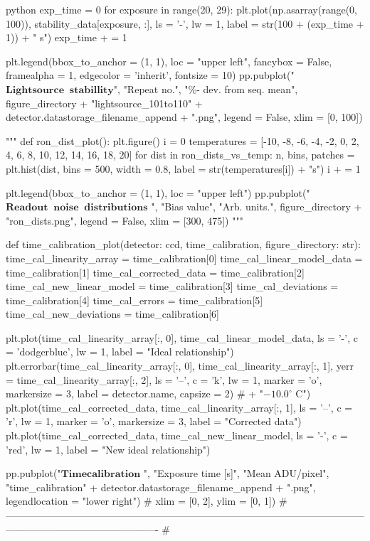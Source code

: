 \documentclass[../main.tex]{subfiles}
\begin{document}
\begin{mintedbox}{python}
exp_time  =  0
for exposure in range(20, 29):
plt.plot(np.asarray(range(0, 100)), stability_data[exposure, :], ls  =  '-', lw  =  1,
label  =  str(100 + (exp_time + 1)) + " s")
exp_time + =  1

plt.legend(bbox_to_anchor  =  (1, 1), loc  =  "upper left", fancybox  =  False, framealpha  =  1, edgecolor  =  'inherit',
fontsize  =  10)
pp.pubplot("$\mathbf{Lightsource\;\;stabillity}$", "Repeat no.", "\%- dev. from seq. mean",
figure_directory + "lightsource_101to110" + detector.datastorage_filename_append + ".png",
legend  =  False, xlim  =  [0, 100])


"""
def ron_dist_plot():
plt.figure()
i  =  0
temperatures  =  [-10, -8, -6, -4, -2, 0, 2, 4, 6, 8, 10, 12, 14, 16, 18, 20]
for dist in ron_dists_vs_temp:
n, bins, patches  =  plt.hist(dist, bins = 500, width = 0.8, label =  str(temperatures[i]) + "s")
i + =  1

plt.legend(bbox_to_anchor = (1, 1), loc = "upper left")
pp.pubplot("$\mathbf{Readout\;\;noise\;\;distributions}$ ", "Bias value", "Arb. units.", figure_directory + "ron_dists.png", legend = False, xlim = [300, 475])
"""


def time_calibration_plot(detector: ccd, time_calibration, figure_directory: str):
time_cal_linearity_array  =  time_calibration[0]
time_cal_linear_model_data  =  time_calibration[1]
time_cal_corrected_data  =  time_calibration[2]
time_cal_new_linear_model  =  time_calibration[3]
time_cal_deviations  =  time_calibration[4]
time_cal_errors  =  time_calibration[5]
time_cal_new_deviations  =  time_calibration[6]

plt.plot(time_cal_linearity_array[:, 0], time_cal_linear_model_data, ls  =  '-', c  =  'dodgerblue', lw  =  1,
label  =  "Ideal relationship")
plt.errorbar(time_cal_linearity_array[:, 0], time_cal_linearity_array[:, 1], yerr  =  time_cal_linearity_array[:, 2],
ls  =  '--', c  =  'k', lw  =  1, marker  =  'o', markersize  =  3, label  =  detector.name,
capsize  =  2)  # + "$-10.0^\circ $ C")
plt.plot(time_cal_corrected_data, time_cal_linearity_array[:, 1], ls  =  '--', c  =  'r', lw  =  1, marker  =  'o',
markersize  =  3, label  =  "Corrected data")
plt.plot(time_cal_corrected_data, time_cal_new_linear_model, ls  =  '-', c  =  'red', lw  =  1,
label  =  "New ideal relationship")

pp.pubplot("$\mathbf{Time calibration}$ ", "Exposure time [s]", "Mean ADU/pixel",
"time_calibration" + detector.datastorage_filename_append + ".png",
legendlocation  =  "lower right")  # xlim = [0, 2], ylim = [0,   1])
# ---------------------------------------------------------------------------------------------------------------------------------------------------------- #


\end{mintedbox}
\end{document}
